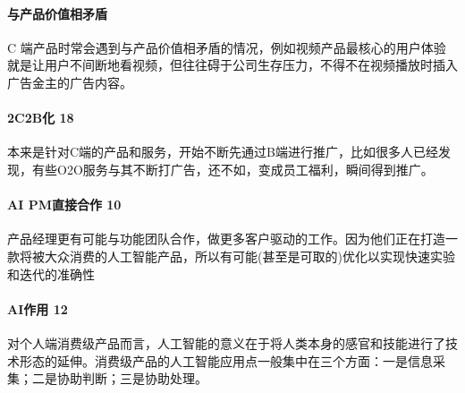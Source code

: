 \documentclass[letterpaper,11pt,english]{sphinxmanual}
\begin{document}
\paragraph{与产品价值相矛盾}
\label{\detokenize{chapter_introduction/2C:id26}}
C
端产品时常会遇到与产品价值相矛盾的情况，例如视频产品最核心的用户体验就是让用户不间断地看视频，但往往碍于公司生存压力，不得不在视频播放时插入广告金主的广告内容。


\paragraph{2C2B化 18\sphinxfootnotemark[92]}
\label{\detokenize{chapter_introduction/2C:c2b-18}}%
\begin{footnotetext}[92]\sphinxAtStartFootnote
{}
%
\end{footnotetext}\ignorespaces 
本来是针对C端的产品和服务，开始不断先通过B端进行推广，比如很多人已经发现，有些O2O服务与其不断打广告，还不如，变成员工福利，瞬间得到推广。


\paragraph{AI PM直接合作 10\sphinxfootnotemark[93]}
\label{\detokenize{chapter_introduction/2C:ai-pm-10}}%
\begin{footnotetext}[93]\sphinxAtStartFootnote
{}
%
\end{footnotetext}\ignorespaces 
产品经理更有可能与功能团队合作，做更多客户驱动的工作。因为他们正在打造一款将被大众消费的人工智能产品，所以有可能(甚至是可取的)优化以实现快速实验和迭代的准确性


\paragraph{AI作用 12\sphinxfootnotemark[94]}
\label{\detokenize{chapter_introduction/2C:ai-12}}%
\begin{footnotetext}[94]\sphinxAtStartFootnote
{}
%
\end{footnotetext}\ignorespaces 
对个人端消费级产品而言，人工智能的意义在于将人类本身的感官和技能进行了技术形态的延伸。消费级产品的人工智能应用点一般集中在三个方面：一是信息采集；二是协助判断；三是协助处理。
\end{document}

